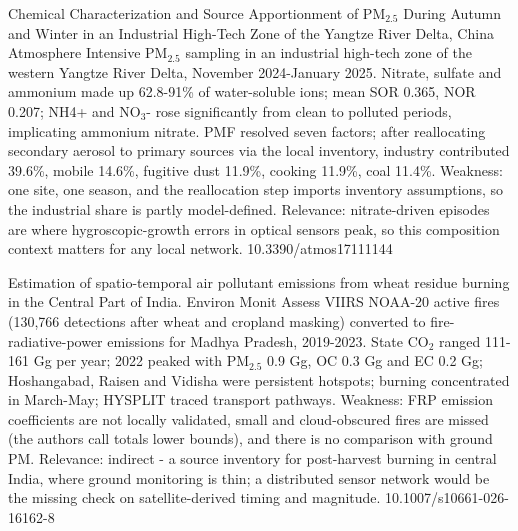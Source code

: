 \documentclass[10pt]{article}
\begin{document}
{Chemical Characterization and Source Apportionment of PM$_{2.5}$ During Autumn and Winter in an Industrial High-Tech Zone of the Yangtze River Delta, China}
{Atmosphere}
{Intensive PM$_{2.5}$ sampling in an industrial high-tech zone of the western Yangtze River Delta, November 2024-January 2025. Nitrate, sulfate and ammonium made up 62.8-91\% of water-soluble ions; mean SOR 0.365, NOR 0.207; NH4+ and NO$_3$- rose significantly from clean to polluted periods, implicating ammonium nitrate. PMF resolved seven factors; after reallocating secondary aerosol to primary sources via the local inventory, industry contributed 39.6\%, mobile 14.6\%, fugitive dust 11.9\%, cooking 11.9\%, coal 11.4\%. Weakness: one site, one season, and the reallocation step imports inventory assumptions, so the industrial share is partly model-defined. Relevance: nitrate-driven episodes are where hygroscopic-growth errors in optical sensors peak, so this composition context matters for any local network.}
{10.3390/atmos17111144}

{Estimation of spatio-temporal air pollutant emissions from wheat residue burning in the Central Part of India.}
{Environ Monit Assess}
{VIIRS NOAA-20 active fires (130,766 detections after wheat and cropland masking) converted to fire-radiative-power emissions for Madhya Pradesh, 2019-2023. State CO$_2$ ranged 111-161 Gg per year; 2022 peaked with PM$_{2.5}$ 0.9 Gg, OC 0.3 Gg and EC 0.2 Gg; Hoshangabad, Raisen and Vidisha were persistent hotspots; burning concentrated in March-May; HYSPLIT traced transport pathways. Weakness: FRP emission coefficients are not locally validated, small and cloud-obscured fires are missed (the authors call totals lower bounds), and there is no comparison with ground PM. Relevance: indirect - a source inventory for post-harvest burning in central India, where ground monitoring is thin; a distributed sensor network would be the missing check on satellite-derived timing and magnitude.}
{10.1007/s10661-026-16162-8}
\end{document}
